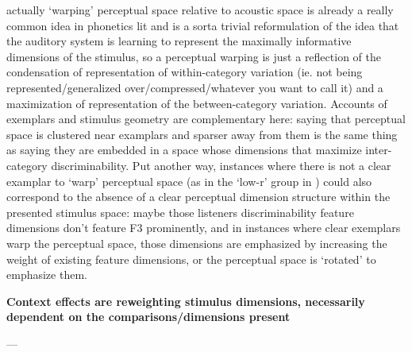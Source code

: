\begin{multicols}{2}
actually `warping' perceptual space relative to acoustic space is already a really common idea in phonetics lit\cite{iversonInfluencesPhoneticIdentification1996,kuhlNewViewLanguage2000} and is a sorta trivial reformulation of the idea that the auditory system is learning to represent the maximally informative dimensions of the stimulus, so a perceptual warping is just a reflection of the condensation of representation of within-category variation (ie. not being represented/generalized over/compressed/whatever you want to call it) and a maximization of representation of the between-category variation. Accounts of exemplars and stimulus geometry are complementary here: saying that perceptual space is clustered near examplars and sparser away from them is the same thing as saying they are embedded in a space whose dimensions that maximize inter-category discriminability. Put another way, instances where there is not a clear examplar to `warp' perceptual space (as in the `low-r' group in \cite{iversonInfluencesPhoneticIdentification1996}) could also correspond to the absence of a clear perceptual dimension structure within the presented stimulus space: maybe those listeners discriminability feature dimensions don't feature F3 prominently, and in instances where clear exemplars warp the perceptual space, those dimensions are emphasized by increasing the weight of existing feature dimensions, or the perceptual space is `rotated' to emphasize them. 

\textbf{Context effects are reweighting stimulus dimensions, necessarily dependent on the comparisons/dimensions present}

---



\end{multicols}
